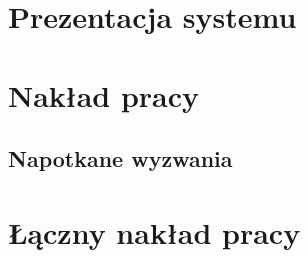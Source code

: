 \chapter{Prezentacja systemu}
\label{ch:prezentacja-systemu}



\chapter{Nakład pracy}
\label{ch:naklad-pracy}

\section{Napotkane wyzwania }
\label{sec:napotkane-wyzwania}


\chapter{Łączny nakład pracy}
\label{sec:laczny-naklad-pracy}




